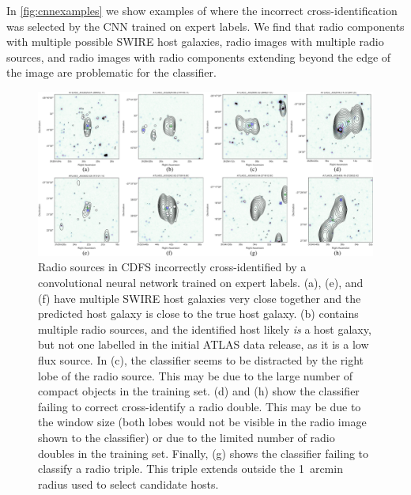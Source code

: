 \documentclass[fleqn,usenatbib,usedcolumn]{mnras}
\newcommand{\todo}[1]{ {\color{red}[{\bf TODO:~{#1}}]} }
\begin{document}
  In \autoref{fig:cnnexamples} we show examples of where the incorrect cross-identification was selected by the CNN trained on expert labels.  We find that radio components with multiple possible SWIRE host galaxies, radio images with multiple radio sources, and radio images with radio components extending beyond the edge of the image are problematic for the classifier. 
  
\begin{figure}
\includegraphics[width=\textwidth]{images/CNN-examples-CDFS.png}
    \caption{Radio sources in CDFS incorrectly cross-identified by a
      convolutional neural network trained on expert labels.
      (a), (e), and (f) have multiple SWIRE host galaxies very close
      together and the predicted host galaxy is close to the true host galaxy.
      (b) contains multiple radio sources, and the
      identified host likely \emph{is} a host galaxy, but not one labelled in
      the initial ATLAS data release, as it is a low flux source. In
      (c), the classifier seems to be distracted by the
      right lobe of the radio source. This may be due to the large number of
      compact objects in the training set.
      (d) and (h) show the
      classifier failing to correct cross-identify a radio double. This may be
      due to the window size (both lobes would not be visible in the radio image
      shown to the classifier) or due to the limited number of radio doubles in
      the training set. Finally,
     (g) shows the classifier failing to classify a radio
      triple. This triple extends outside the 1~arcmin radius used to select
      candidate hosts.}\label{fig:cnnexamples}
\end{figure}

 
\end{document}

